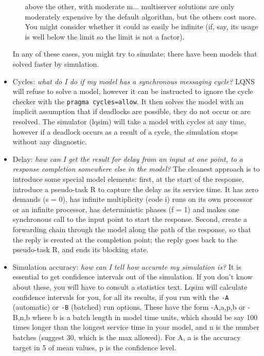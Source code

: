 \documentclass[11pt]{article}
\begin{document}
\begin{itemize}
\begin{enumerate}
  above the other, with moderate m... multiserver solutions are only
  moderately expensive by the default algorithm, but the others cost
  more. You might consider whether it could as easily be infinite (if,
  say, its usage is well below the limit so the limit is not a
  factor). 
  \end{enumerate}
  In any of these cases, you might try to simulate; there
  have been models that solved faster by simulation.
\item Cycles: \emph{what do I do if my model has a synchronous
    messaging cycle?} LQNS will refuse to solve a model, however it
  can be instructed to ignore the cycle checker with the
  \texttt{pragma~cycles=allow}. It then solves the model with an
  implicit assumption that if deadlocks are possible, they do not
  occur or are resolved.  The simulator (lqsim) will take a model
  with cycles at any time, however if a deadlock occurs as a result of
  a cycle, the simulation stops without any diagnostic.
\item Delay: \emph{how can I get the result for delay from an input at
    one point, to a response completion somewhere else in the model?}
  The cleanest approach is to introduce some special model elements:
  first, at the start of the response, introduce a pseudo-task R to
  capture the delay as its service time. It has zero demands (s = 0),
  has infinite multiplicity (code i) runs on its own processor or an
  infinite processor, has deterministic phases (f = 1) and makes one
  synchronous call to the input point to start the response. Second,
  create a forwarding chain through the model along the path of the
  response, so that the reply is created at the completion point; the
  reply goes back to the pseudo-task R, and ends its blocking state.
\item Simulation accuracy: \emph{how can I tell how accurate my
    simulation is?} It is essential to get confidence
  intervals out of
  the simulation. If you don't know about these, you will have to
  consult a statistics text. Lqsim will calculate confidence
  intervals for you, for all its results, if you run with the
  \texttt{-A} (automatic) or \texttt{-B} (batched) run options. These
  have the form -A,a,p,b or -B,n,b where b is a batch length in model
  time units, which should be say 100 times longer than the longest
  service time in your model, and n is the number batches (suggest 30,
  which is the max allowed). For A, a is the accuracy target in 5 of
  mean values, p is the confidence level.
\end{itemize}
\clearpage
\appendix
\end{document}
